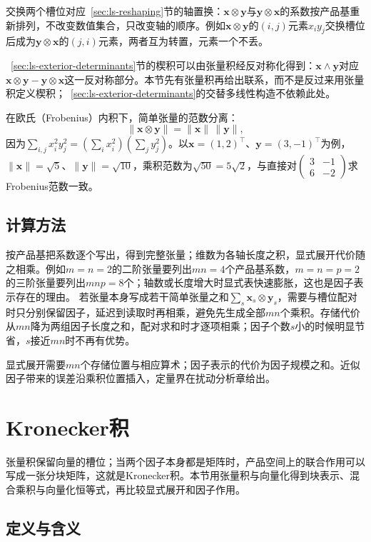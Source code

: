 交换两个槽位对应~\ref{sec:ls-reshaping}节的轴置换：$\bm x\otimes\bm y$与$\bm y\otimes\bm x$的系数按产品基重新排列，不改变数值集合，只改变轴的顺序。例如$\bm x\otimes\bm y$的$(i,j)$元素$x_i y_j$交换槽位后成为$\bm y\otimes\bm x$的$(j,i)$元素，两者互为转置，元素一个不丢。

~\ref{sec:ls-exterior-determinants}节的楔积可以由张量积经反对称化得到：$\bm x\wedge\bm y$对应$\bm x\otimes\bm y-\bm y\otimes\bm x$这一反对称部分。本节先有张量积再给出联系，而不是反过来用张量积定义楔积；~\ref{sec:ls-exterior-determinants}的交替多线性构造不依赖此处。

在欧氏（Frobenius）内积下，简单张量的范数分离：
\[
 \lVert\bm x\otimes\bm y\rVert=\lVert\bm x\rVert\,\lVert\bm y\rVert,
\]
因为$\sum_{i,j}x_i^2y_j^2=(\sum_i x_i^2)(\sum_j y_j^2)$。以$\bm x=(1,2)^\top$、$\bm y=(3,-1)^\top$为例，$\lVert\bm x\rVert=\sqrt5$、$\lVert\bm y\rVert=\sqrt{10}$，乘积范数为$\sqrt{50}=5\sqrt2$，与直接对$\begin{pmatrix}3&-1\\6&-2\end{pmatrix}$求Frobenius范数一致。

\subsection{计算方法}

按产品基把系数逐个写出，得到完整张量；维数为各轴长度之积，显式展开代价随之相乘。例如$m=n=2$的二阶张量要列出$mn=4$个产品基系数，$m=n=p=2$的三阶张量要列出$mnp=8$个；轴数或长度增大时显式表快速膨胀，这也是因子表示存在的理由。
若张量本身写成若干简单张量之和$\sum_s\bm x_s\otimes\bm y_s$，需要与槽位配对时只分别保留因子，延迟到读取时再相乘，避免先生成全部$mn$个乘积。存储代价从$mn$降为两组因子长度之和，配对求和时才逐项相乘；因子个数$s$小的时候明显节省，$s$接近$mn$时不再有优势。

显式展开需要$mn$个存储位置与相应算术；因子表示的代价为因子规模之和。近似因子带来的误差沿乘积位置插入，定量界在扰动分析章给出。

\section{Kronecker积}
\label{sec:ls-kronecker-products}

张量积保留向量的槽位；当两个因子本身都是矩阵时，产品空间上的联合作用可以写成一张分块矩阵，这就是Kronecker积。本节用张量积与向量化得到块表示、混合乘积与向量化恒等式，再比较显式展开和因子作用。

\subsection{定义与含义}

